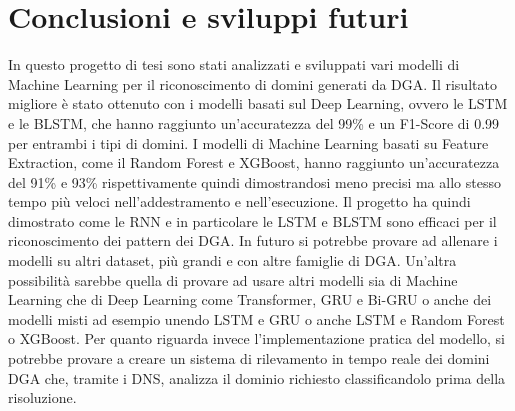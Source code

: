 \documentclass[12pt,a4paper,openright,twoside]{book}
\begin{document}
\chapter{Conclusioni e sviluppi futuri}
In questo progetto di tesi sono stati analizzati e sviluppati
vari modelli di Machine Learning per il riconoscimento
di domini generati da DGA.
Il risultato migliore è stato ottenuto con i modelli basati sul 
Deep Learning, ovvero le LSTM e le BLSTM,
che hanno raggiunto un'accuratezza del 99\% e un F1-Score
di 0.99 per entrambi i tipi di domini.
I modelli di Machine Learning basati su Feature Extraction, come il Random Forest e XGBoost,
hanno raggiunto un'accuratezza del 91\% e 93\% rispettivamente
quindi dimostrandosi meno precisi ma allo stesso tempo
più veloci nell'addestramento e nell'esecuzione.
Il progetto ha quindi dimostrato come le RNN e in particolare le LSTM e BLSTM
sono efficaci per il riconoscimento dei pattern dei DGA. \hfill \break
In futuro si potrebbe provare ad allenare i modelli su altri dataset,
più grandi e con altre famiglie di DGA.
Un'altra possibilità sarebbe quella di provare ad usare altri modelli
sia di Machine Learning che di Deep Learning come Transformer, GRU e Bi-GRU o anche dei modelli
misti ad esempio unendo LSTM e GRU o anche LSTM e Random Forest o XGBoost.
Per quanto riguarda invece l'implementazione pratica del modello, si potrebbe provare a creare un sistema
di rilevamento in tempo reale dei domini DGA che, tramite i DNS, analizza il dominio richiesto
classificandolo prima della risoluzione.





% 




\backmatter
\cleardoublepage
{}

\end{document}
